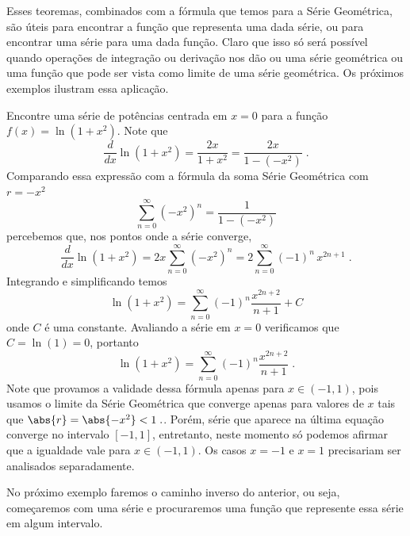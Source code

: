 Esses teoremas, combinados com a fórmula que temos para a Série Geométrica,
são úteis para encontrar a função que representa uma dada série,
ou para encontrar uma série para uma dada função. Claro que isso só será possível quando
operações de integração ou derivação nos dão ou uma série geométrica ou uma função que
pode ser vista como limite de uma série geométrica. Os próximos exemplos ilustram essa
aplicação.

\begin{example}
  Encontre uma série de potências centrada em $x=0$ para a função
  \(
    f(x)=\ln \left( 1+x^2 \right)
  \).
  \solution
  Note que
  \[
    \frac{d}{dx} \ln\left( 1+x^2 \right)
      = \frac{2x}{1+x^2}
      = \frac{2x}{1-\left(-x^2\right)}   \;.
  \]
  Comparando essa expressão com a fórmula da soma
  Série Geométrica com $r=-x^2$
  \[
    \sum_{n=0}^\infty \left(-x^2\right)^n=\frac{1}{1-\left(-x^2\right)}
  \]
  percebemos que, nos pontos onde a série converge,
  \[
    \frac{d}{dx}\ln\left( 1+x^2 \right)
      = 2x \sum_{n=0}^\infty \left(-x^2 \right)^n
      = 2  \sum_{n=0}^\infty (-1)^n\,x^{2n+1}     \;.
  \]
  Integrando e simplificando temos
  \[
    \ln\left( 1+x^2 \right) = \sum_{n=0}^\infty (-1)^n\frac{x^{2n+2}}{\,n+1\,}+C
  \]
  onde $C$ é uma constante.
  Avaliando a série em $x=0$ verificamos que $C=\ln(1)=0$, portanto
  \[
    \ln\left( 1+x^2 \right) = \sum_{n=0}^\infty (-1)^n\frac{x^{2n+2}}{n+1}     \;.
  \]
  Note que provamos a validade dessa fórmula apenas para $x\in(-1,1)$,
  pois usamos o limite da Série Geométrica que converge apenas para valores
  de $x$ tais que
  \(
    \abs{r}=\abs{-x^2}<1     \;.
  \).
  Porém, série que aparece na última equação
  converge no intervalo $[-1, 1]$, entretanto, neste momento
  só podemos afirmar que a igualdade vale para $x\in (-1, 1)$.
  Os casos $x=-1$ e $x=1$ precisariam ser analisados separadamente.
\end{example}

No próximo exemplo faremos o caminho inverso do anterior, ou seja,
começaremos com uma série e procuraremos uma função que represente
essa série em algum intervalo.


